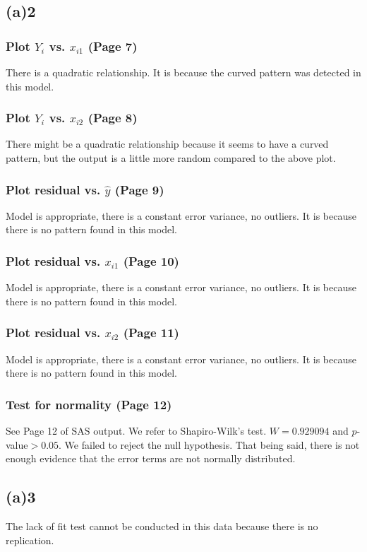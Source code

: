 \documentclass[letterpaper]{article}
\begin{document}
\subsection{(a)2}
\subsubsection{Plot $Y_i$ vs. $x_{i1}$  (Page 7)}
There is a quadratic relationship. It is because the curved pattern was detected in this model.

\subsubsection{Plot $Y_i$ vs. $x_{i2}$ (Page 8)}
There might be a quadratic relationship because it seems to have a curved pattern, but the output is a little more random compared to the above plot.

\subsubsection{Plot residual vs. $\hat{y}$  (Page 9)}
Model is appropriate, there is a constant error variance, no outliers. It is because there is no pattern found in this model.

\subsubsection{Plot residual vs. $x_{i1}$ (Page 10)}
Model is appropriate, there is a constant error variance, no outliers. It is because there is no pattern found in this model.

\subsubsection{Plot residual vs. $x_{i2}$ (Page 11)}
Model is appropriate, there is a constant error variance, no outliers. It is because there is no pattern found in this model.

\subsubsection{Test for normality (Page 12)}
See Page 12 of SAS output. We refer to Shapiro-Wilk's test. $W = 0.929094$ and $p$-value$>0.05$. We failed to reject the null hypothesis. That being said, there is not enough evidence that the error terms are not normally distributed.

\subsection{(a)3}
\begin{flushleft}
The lack of fit test cannot be conducted in this data because there is no replication.
\end{flushleft}
\end{document}

